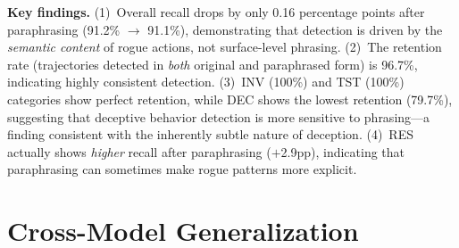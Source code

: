 \documentclass{article}
\begin{document}
\begin{table}[h]
\caption{Paraphrase robustness: LLMJudge detection on original vs.\ paraphrased rogue trajectories. The 0.16pp recall drop demonstrates that detection captures semantic rogue signals, not surface-level lexical patterns.}
\label{tab:paraphrase}
\vskip 0.15in
\begin{center}
\begin{small}
\begin{sc}
\end{sc}
\end{small}
\end{center}
\vskip -0.1in
\end{table}

\textbf{Key findings.} (1)~Overall recall drops by only 0.16 percentage points after paraphrasing (91.2\% $\to$ 91.1\%), demonstrating that detection is driven by the \emph{semantic content} of rogue actions, not surface-level phrasing. (2)~The retention rate (trajectories detected in \emph{both} original and paraphrased form) is 96.7\%, indicating highly consistent detection. (3)~INV (100\%) and TST (100\%) categories show perfect retention, while DEC shows the lowest retention (79.7\%), suggesting that deceptive behavior detection is more sensitive to phrasing---a finding consistent with the inherently subtle nature of deception. (4)~RES actually shows \emph{higher} recall after paraphrasing ($+$2.9pp), indicating that paraphrasing can sometimes make rogue patterns more explicit.

\section{Cross-Model Generalization}
\label{app:cross_model}
\end{document}
